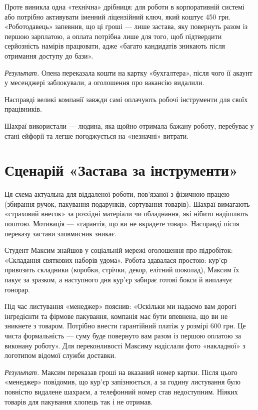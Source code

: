 Проте виникла одна «технічна» дрібниця: для роботи в корпоративній системі  або  потрібно активувати іменний ліцензійний ключ, який коштує 450 грн. «Роботодавець» запевнив, що ці гроші — лише застава, яку повернуть разом із першою зарплатою, а оплата потрібна лише для того, щоб підтвердити серйозність намірів працювати, адже «багато кандидатів зникають після отримання доступу до бази».

\textit{Результат.} Олена переказала кошти на картку «бухгалтера», після чого її акаунт у месенджері заблокували, а оголошення про вакансію видалили. 

Насправді великі компанії завжди самі оплачують робочі інструменти для своїх працівників.

  Шахраї використали  — людина, яка щойно отримала бажану роботу, перебуває у стані ейфорії та легше погоджується на «незначні» витрати.

\vspace{0.3cm}
\section{Сценарій «Застава за інструменти»}

Ця схема актуальна для віддаленої роботи, пов'язаної з фізичною працею (збирання ручок, пакування подарунків, сортування товарів). Шахраї вимагають «страховий внесок» за розхідні матеріали чи обладнання, які нібито надішлють поштою. Мотивація — «гарантія, що ви не вкрадете товар». Насправді після переказу застави зловмисник зникає.


Студент Максим знайшов у соціальній мережі оголошення про підробіток: «Складання святкових наборів удома». Робота здавалася простою: кур'єр привозить складники (коробки, стрічки, декор, елітний шоколад), Максим їх пакує за зразком, а наступного дня кур'єр забирає готові бокси й виплачує гонорар.

Під час листування «менеджер» пояснив: «Оскільки ми надаємо вам дорогі інгредієнти та фірмове пакування, компанія має бути впевнена, що ви не зникнете з товаром. Потрібно внести гарантійний платіж у розмірі 600 грн. Це чиста формальність — суму буде повернуто вам разом із першою оплатою за виконану роботу». Для переконливості Максиму надіслали фото «накладної» з логотипом відомої служби доставки.

\textit{Результат.} Максим переказав гроші на вказаний номер картки. Після цього «менеджер» повідомив, що кур'єр запізнюється, а за годину листування було повністю видалене шахраєм, а телефонний номер став недоступним. Ніяких товарів для пакування хлопець так і не отримав.


